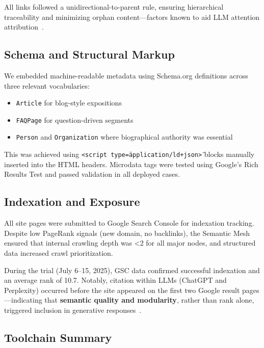 All links followed a unidirectional-to-parent rule, ensuring hierarchical traceability and minimizing orphan content—factors known to aid LLM attention attribution~\cite{aggarwal2024geo}.

\subsection{Schema and Structural Markup}

We embedded machine-readable metadata using Schema.org definitions across three relevant vocabularies:
\begin{itemize}
  \item \texttt{Article} for blog-style expositions
  \item \texttt{FAQPage} for question-driven segments
  \item \texttt{Person} and \texttt{Organization} where biographical authority was essential
\end{itemize}

This was achieved using \texttt{<script type=\"application/ld+json\">} blocks manually inserted into the HTML headers. Microdata tags were tested using Google’s Rich Results Test and passed validation in all deployed cases.

\subsection{Indexation and Exposure}

All site pages were submitted to Google Search Console for indexation tracking. Despite low PageRank signals (new domain, no backlinks), the Semantic Mesh ensured that internal crawling depth was <2 for all major nodes, and structured data increased crawl prioritization.

During the trial (July 6–15, 2025), GSC data confirmed successful indexation and an average rank of 10.7. Notably, citation within LLMs (ChatGPT and Perplexity) occurred before the site appeared on the first two Google result pages—indicating that \textbf{semantic quality and modularity}, rather than rank alone, triggered inclusion in generative responses~\cite{aggarwal2024geo}.

\subsection{Toolchain Summary}

